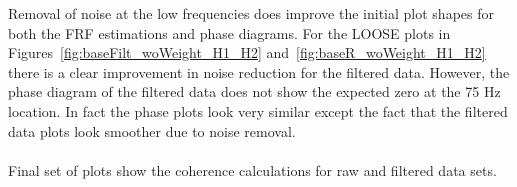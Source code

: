 \documentclass[paper=a4, fontsize=12pt]{scrartcl} %
\begin{document}
%
Removal of noise at the low frequencies does improve the initial plot shapes for both the FRF estimations and phase diagrams. For the LOOSE plots in Figures~\ref{fig:baseFilt_woWeight_H1_H2} and~\ref{fig:baseR_woWeight_H1_H2} there is a clear improvement in noise reduction for the filtered data. However, the phase diagram of the filtered data does not show the expected zero at the 75 Hz location. In fact the phase plots look very similar except the fact that the filtered data plots look smoother due to noise removal.
\\
\\
Final set of plots show the coherence calculations for raw and filtered data sets.
%
	\begin{figure}[H]
		\centering
		\quad
		\label{fig:baseCohFigs1}
	\end{figure}
\end{document}
